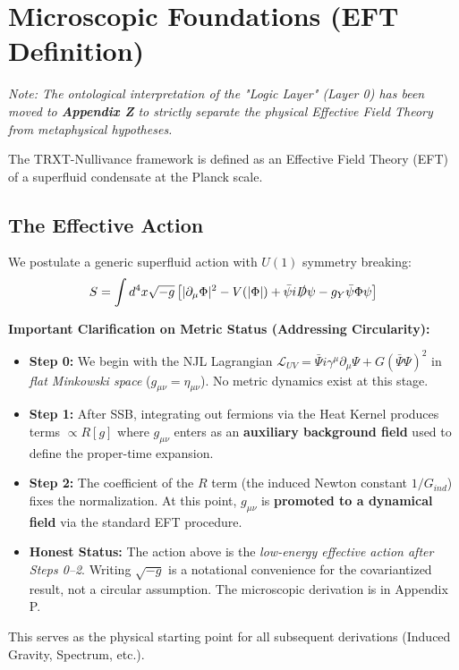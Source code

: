 \documentclass[a4paper,12pt]{article}
\begin{document}
\section{Microscopic Foundations (EFT Definition)}

\textit{Note: The ontological interpretation of the "Logic Layer" (Layer 0) has been moved to \textbf{Appendix Z} to strictly separate the physical Effective Field Theory from metaphysical hypotheses.}

The TRXT-Nullivance framework is defined as an Effective Field Theory (EFT) of a superfluid condensate at the Planck scale.
\subsection{The Effective Action}
We postulate a generic superfluid action with $U(1)$ symmetry breaking:
\begin{equation}
    S = \int d^4x \sqrt{-g} \left[ |\partial_\mu \Phi|^2 - V(|\Phi|) + \bar{\psi} i \slashed{D} \psi - g_Y \bar{\psi} \Phi \psi \right]
\end{equation}

\textbf{Important Clarification on Metric Status (Addressing Circularity):}
\begin{itemize}
    \item \textbf{Step 0:} We begin with the NJL Lagrangian $\mathcal{L}_{UV} = \bar{\Psi} i \gamma^\mu \partial_\mu \Psi + G(\bar{\Psi}\Psi)^2$ in \emph{flat Minkowski space} ($g_{\mu\nu} = \eta_{\mu\nu}$). No metric dynamics exist at this stage.
    \item \textbf{Step 1:} After SSB, integrating out fermions via the Heat Kernel produces terms $\propto R[g]$ where $g_{\mu\nu}$ enters as an \textbf{auxiliary background field} used to define the proper-time expansion.
    \item \textbf{Step 2:} The coefficient of the $R$ term (the induced Newton constant $1/G_{ind}$) fixes the normalization. At this point, $g_{\mu\nu}$ is \textbf{promoted to a dynamical field} via the standard EFT procedure.
    \item \textbf{Honest Status:} The action above is the \emph{low-energy effective action after Steps 0--2}. Writing $\sqrt{-g}$ is a notational convenience for the covariantized result, not a circular assumption. The microscopic derivation is in Appendix P.
\end{itemize}
This serves as the physical starting point for all subsequent derivations (Induced Gravity, Spectrum, etc.).
\end{document}
